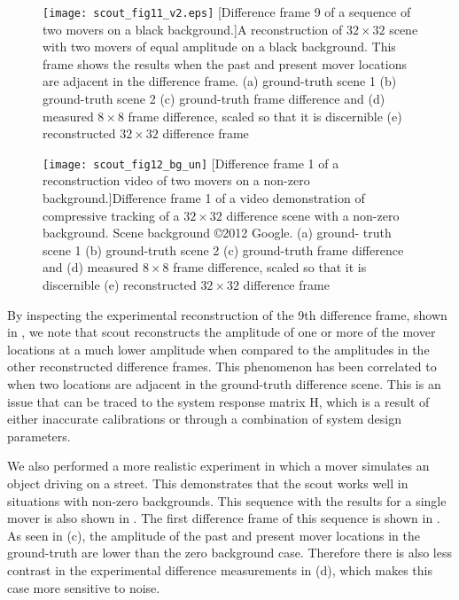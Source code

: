 \begin{figure}
	\centering
	\texttt{[image: scout\_fig11\_v2.eps]}
	[Difference frame 9 of a sequence of two movers on a black background.]{A reconstruction of $32 \times 32$ scene with two movers of equal amplitude on a black background. This frame shows the results when the past and present mover locations are adjacent in the difference frame. (a) ground-truth scene 1 (b) ground-truth scene 2 (c) ground-truth frame difference and (d) measured $8 \times 8$ frame difference, scaled so that it is discernible (e) reconstructed $32 \times 32$ difference frame}
	\label{fig:scout_fig11_un}
\end{figure}


\begin{figure}
	\centering
	\texttt{[image: scout\_fig12\_bg\_un]}
	[Difference frame 1 of a reconstruction video of two movers on a non-zero background.]{Difference frame 1 of a video demonstration of compressive tracking of a  $32 \times 32$ difference scene with a non-zero background. Scene background ©2012 Google. (a) ground- truth scene 1 (b) ground-truth scene 2 (c) ground-truth frame difference and (d) measured $8 \times 8$ frame difference, scaled so that it is discernible (e) reconstructed $32 \times 32$ difference frame}
	\label{fig:scout_fig12_bg_un}
\end{figure}


By inspecting the experimental reconstruction of the 9th difference frame, shown in , we note that \gls{scout} reconstructs the amplitude of one or more of the mover locations at a much lower amplitude when compared to the amplitudes in the other reconstructed difference frames. This phenomenon has been correlated to when two locations are adjacent in the ground-truth difference scene. This is an issue that can be traced to the system response matrix H, which is a result of either inaccurate calibrations or through a combination of system design parameters. 


We also performed a more realistic experiment in which a mover simulates an object driving on a street. This demonstrates that the \gls{scout} works well in situations with non-zero backgrounds. This sequence with the results for a single mover is also shown in . The first difference frame of this sequence is shown in . As seen in (c), the amplitude of the past and present mover locations in the ground-truth are lower than the zero background case. Therefore there is also less contrast in the experimental difference measurements in (d), which makes this case more sensitive to noise. 


